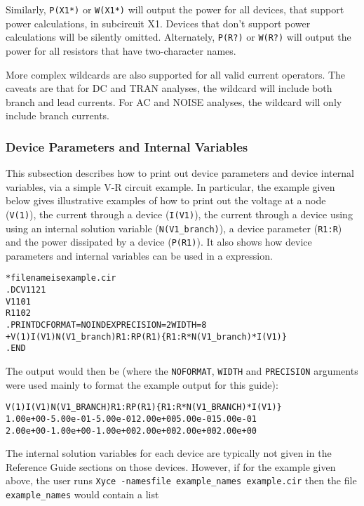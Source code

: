 Similarly, \texttt{P(X1*)} or \texttt{W(X1*)} will output the
power for all devices, that support power calculations, in subcircuit X1.
Devices that don't support power calculations
will be silently omitted.  Alternately, \texttt{P(R?)} or \texttt{W(R?)}
will output the power for all resistors that have two-character names.

More complex wildcards are also supported for all valid current operators.
The caveats are that for DC and TRAN analyses, the wildcard will include
both branch and lead currents.  For AC and NOISE analyses, the wildcard will
only include branch currents. 

\subsubsection{Device Parameters and Internal Variables}
\label{Print_Device_Info}
This subsection describes how to print out device parameters and device 
internal variables, via a simple V-R circuit example. In particular, 
the example given below gives illustrative examples of how to print out the voltage
at a node ({\tt V(1)}), the current through a device ({\tt I(V1)}), the current through
a device using using an internal solution variable ({\tt N(V1\_branch)}), a device 
parameter ({\tt R1:R}) and the power dissipated by a device ({\tt P(R1)}).  It also shows
how device parameters and internal variables can be used in a \Xyce{} expression.
\begin{alltt}
* filename is example.cir
.DC V1 1 2 1
V1 1 0 1
R1 1 0 2
.PRINT DC FORMAT=NOINDEX PRECISION=2 WIDTH=8 
+ V(1) I(V1) N(V1_branch) R1:R P(R1) \{R1:R*N(V1_branch)*I(V1)\}
.END
\end{alltt}
The \Xyce{} output would then be (where the {\tt NOFORMAT}, {\tt WIDTH} and {\tt PRECISION}
arguments were used mainly to format the example output for this guide):
\begin{alltt}
   V(1)        I(V1)    N(V1\_BRANCH)    R1:R        P(R1)    \{R1:R*N(V1\_BRANCH)*I(V1)\}
   1.00e+00   -5.00e-01   -5.00e-01    2.00e+00    5.00e-01    5.00e-01
   2.00e+00   -1.00e+00   -1.00e+00    2.00e+00    2.00e+00    2.00e+00
\end{alltt}
The internal solution variables for each \Xyce{} device are typically not given in the Reference 
Guide sections on those devices.  However, if for the example given above, the user runs \texttt{Xyce 
-namesfile example\_names example.cir} then the file \texttt{example\_names} would contain a list
